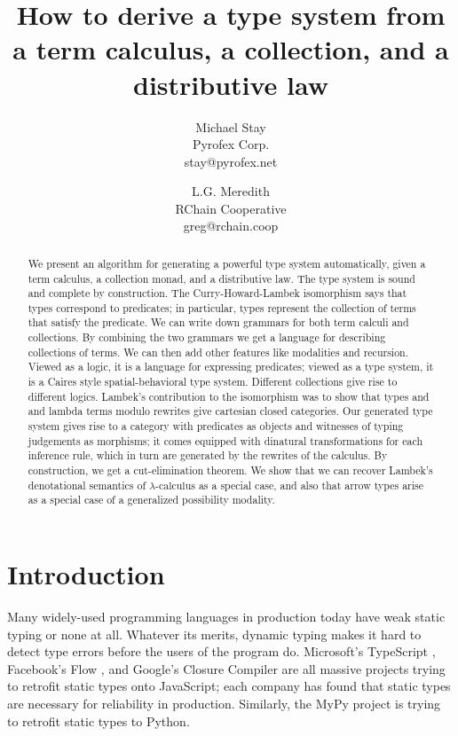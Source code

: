 \documentclass[a4paper,UKenglish]{article}
\newcommand{\lac}{$\lambda\mbox{-calculus}$\xspace}
\begin{document}
\EnableBpAbbreviations
\title{How to derive a type system from a term calculus, a collection, and a distributive law}
\author{
Michael Stay\\
  {Pyrofex Corp.}\\
  {\fontsize{8}{8}\selectfont stay@pyrofex.net}\\
  \and
  L.G. Meredith\\
  {RChain Cooperative}\\
  {\fontsize{8}{8}\selectfont greg@rchain.coop}
}
\maketitle
\begin{abstract}
  \noindent We present an algorithm for generating a powerful type system automatically, given a term calculus, a collection monad, and a distributive law.  The type system is sound and complete by construction.  The Curry-Howard-Lambek isomorphism says that types correspond to predicates; in particular, types represent the collection of terms that satisfy the predicate.  We can write down grammars for both term calculi and collections. By combining the two grammars we get a language for describing collections of terms.  We can then add other features like modalities and recursion.  Viewed as a logic, it is a language for expressing predicates; viewed as a type system, it is a Caires style spatial-behavioral type system.  Different collections give rise to different logics.  Lambek's contribution to the isomorphism was to show that types and and lambda terms modulo rewrites give cartesian closed categories.  Our generated type system gives rise to a category with predicates as objects and witnesses of typing judgements as morphisms; it comes equipped with dinatural transformations for each inference rule, which in turn are generated by the rewrites of the calculus.  By construction, we get a cut-elimination theorem.  We show that we can recover Lambek's denotational semantics of \lac as a special case, and also that arrow types arise as a special case of a generalized possibility modality.
\end{abstract}

\EnableBpAbbreviations

\section{Introduction}

Many widely-used programming languages in production today have weak static typing or none at all.  Whatever its merits, dynamic typing makes it hard to detect type errors before the users of the program do.  Microsoft's TypeScript \cite{TypeScript},
Facebook's Flow \cite{Flow}, 
and Google's Closure Compiler \cite{Closure}
are all massive projects trying to retrofit static types onto JavaScript; each company has found that static types are necessary for reliability in production.  Similarly, the MyPy project \cite{MyPy}
is trying to retrofit static types to Python.
\end{document}
